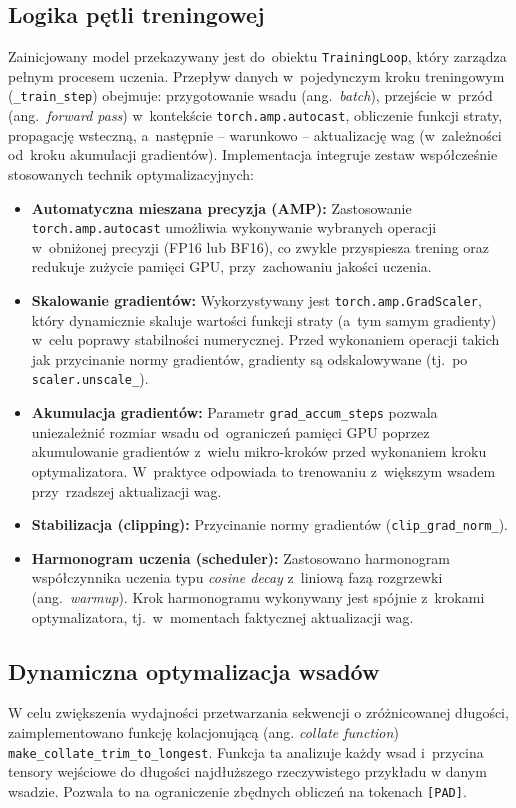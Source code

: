 \documentclass[a4paper,11pt,twoside]{report}
\theoremstyle{definition}
\begin{document}
\subsection{Logika pętli treningowej}\label{sec:training-loop}
Zainicjowany model przekazywany jest do~obiektu \texttt{TrainingLoop}, który zarządza pełnym procesem uczenia. Przepływ danych w~pojedynczym kroku treningowym (\texttt{\_train\_step}) obejmuje: przygotowanie wsadu (ang.\ \emph{batch}), przejście w~przód (ang.\ \emph{forward pass}) w~kontekście \texttt{torch.amp.autocast}, obliczenie funkcji straty, propagację wsteczną, a~następnie -- warunkowo -- aktualizację wag (w~zależności od~kroku akumulacji gradientów). Implementacja integruje zestaw współcześnie stosowanych technik optymalizacyjnych:

\begin{itemize}
    \item \textbf{Automatyczna mieszana precyzja (AMP):} Zastosowanie \texttt{torch.amp.autocast} umożliwia wykonywanie wybranych operacji w~obniżonej precyzji (FP16 lub BF16), co zwykle przyspiesza trening oraz redukuje zużycie pamięci GPU, przy~zachowaniu jakości uczenia.
    \item \textbf{Skalowanie gradientów:} Wykorzystywany jest \texttt{torch.amp.GradScaler}, który dynamicznie skaluje wartości funkcji straty (a~tym samym gradienty) w~celu poprawy stabilności numerycznej. Przed wykonaniem operacji takich jak przycinanie normy gradientów, gradienty są odskalowywane (tj.\ po \texttt{scaler.unscale\_}).
    \item \textbf{Akumulacja gradientów:} Parametr \texttt{grad\_accum\_steps} pozwala uniezależnić rozmiar wsadu od~ograniczeń pamięci GPU poprzez akumulowanie gradientów z~wielu mikro-kroków przed wykonaniem kroku optymalizatora. W~praktyce odpowiada to trenowaniu z~większym wsadem przy~rzadszej aktualizacji wag.
    \item \textbf{Stabilizacja (clipping):} Przycinanie normy gradientów (\texttt{clip\_grad\_norm\_}).
    \item \textbf{Harmonogram uczenia (scheduler):} Zastosowano harmonogram współczynnika uczenia typu \emph{cosine decay} z~liniową fazą rozgrzewki (ang.\ \emph{warmup}). Krok harmonogramu wykonywany jest spójnie z~krokami optymalizatora, tj.\ w~momentach faktycznej aktualizacji wag.
\end{itemize}



\subsection{Dynamiczna optymalizacja wsadów} \label{sec:dynamic-batch-size}
W celu zwiększenia wydajności przetwarzania sekwencji o zróżnicowanej długości, zaimplementowano funkcję kolacjonującą (ang. \emph{collate function}) \texttt{make\_collate\_trim\_to\_longest}.
Funkcja ta analizuje każdy wsad i~przycina tensory wejściowe do długości najdłuższego rzeczywistego przykładu w danym wsadzie. Pozwala to na ograniczenie zbędnych obliczeń na tokenach \texttt{[PAD]}.
\end{document}
